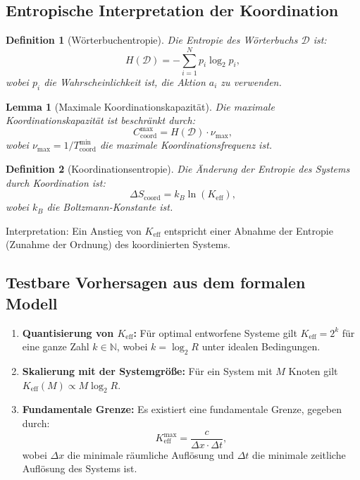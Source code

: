 \documentclass[12pt]{article}
\newtheorem{definition}{Definition}
\newtheorem{lemma}{Lemma}
\begin{document}
	\subsection{Entropische Interpretation der Koordination}
	\label{app:entropy}
	
	\begin{definition}[Wörterbuchentropie]
		Die Entropie des Wörterbuchs $\mathcal{D}$ ist:
		\[
		H(\mathcal{D}) = - \sum_{i=1}^{N} p_i \log_2 p_i,
		\]
		wobei $p_i$ die Wahrscheinlichkeit ist, die Aktion $a_i$ zu verwenden.
	\end{definition}
	
	\begin{lemma}[Maximale Koordinationskapazität]
		Die maximale Koordinationskapazität ist beschränkt durch:
		\[
		C_{\text{coord}}^{\text{max}} = H(\mathcal{D}) \cdot \nu_{\text{max}},
		\]
		wobei $\nu_{\text{max}} = 1 / T_{\text{coord}}^{\text{min}}$ die maximale Koordinationsfrequenz ist.
	\end{lemma}
	
	\begin{definition}[Koordinationsentropie]
		Die Änderung der Entropie des Systems durch Koordination ist:
		\[
		\Delta S_{\text{coord}} = k_B \ln(K_{\mathrm{eff}}),
		\]
		wobei $k_B$ die Boltzmann-Konstante ist.
	\end{definition}
	
	Interpretation: Ein Anstieg von $K_{\mathrm{eff}}$ entspricht einer Abnahme der Entropie (Zunahme der Ordnung) des koordinierten Systems.
	
	\subsection{Testbare Vorhersagen aus dem formalen Modell}
	\label{app:predictions}
	
	\begin{enumerate}
		\item \textbf{Quantisierung von $K_{\mathrm{eff}}$:} Für optimal entworfene Systeme gilt $K_{\mathrm{eff}} = 2^k$ für eine ganze Zahl $k \in \mathbb{N}$, wobei $k = \log_2 R$ unter idealen Bedingungen.
		
		\item \textbf{Skalierung mit der Systemgröße:} Für ein System mit $M$ Knoten gilt $K_{\mathrm{eff}}(M) \propto M \log_2 R$.
		
		\item \textbf{Fundamentale Grenze:} Es existiert eine fundamentale Grenze, gegeben durch:
		\[
		K_{\mathrm{eff}}^{\text{max}} = \frac{c}{\Delta x \cdot \Delta t},
		\]
		wobei $\Delta x$ die minimale räumliche Auflösung und $\Delta t$ die minimale zeitliche Auflösung des Systems ist.
	\end{enumerate}
	
\end{document}
